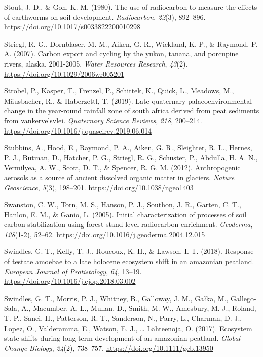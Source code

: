 \documentclass[]{article}
\begin{document}
\leavevmode\hypertarget{ref-Stout_1980}{}%
Stout, J. D., \& Goh, K. M. (1980). The use of radiocarbon to measure
the effects of earthworms on soil development. \emph{Radiocarbon},
\emph{22}(3), 892--896. \url{https://doi.org/10.1017/s0033822200010298}

\leavevmode\hypertarget{ref-Striegl_2007}{}%
Striegl, R. G., Dornblaser, M. M., Aiken, G. R., Wickland, K. P., \&
Raymond, P. A. (2007). Carbon export and cycling by the yukon, tanana,
and porcupine rivers, alaska, 2001-2005. \emph{Water Resources
Research}, \emph{43}(2). \url{https://doi.org/10.1029/2006wr005201}

\leavevmode\hypertarget{ref-Strobel_2019}{}%
Strobel, P., Kasper, T., Frenzel, P., Schittek, K., Quick, L., Meadows,
M., Mäusbacher, R., \& Haberzettl, T. (2019). Late quaternary
palaeoenvironmental change in the year-round rainfall zone of south
africa derived from peat sediments from vankervelsvlei. \emph{Quaternary
Science Reviews}, \emph{218}, 200--214.
\url{https://doi.org/10.1016/j.quascirev.2019.06.014}

\leavevmode\hypertarget{ref-Stubbins_2012}{}%
Stubbins, A., Hood, E., Raymond, P. A., Aiken, G. R., Sleighter, R. L.,
Hernes, P. J., Butman, D., Hatcher, P. G., Striegl, R. G., Schuster, P.,
Abdulla, H. A. N., Vermilyea, A. W., Scott, D. T., \& Spencer, R. G. M.
(2012). Anthropogenic aerosols as a source of ancient dissolved organic
matter in glaciers. \emph{Nature Geoscience}, \emph{5}(3), 198--201.
\url{https://doi.org/10.1038/ngeo1403}

\leavevmode\hypertarget{ref-Swanston_2005}{}%
Swanston, C. W., Torn, M. S., Hanson, P. J., Southon, J. R., Garten, C.
T., Hanlon, E. M., \& Ganio, L. (2005). Initial characterization of
processes of soil carbon stabilization using forest stand-level
radiocarbon enrichment. \emph{Geoderma}, \emph{128}(1-2), 52--62.
\url{https://doi.org/10.1016/j.geoderma.2004.12.015}

\leavevmode\hypertarget{ref-Swindles_2018}{}%
Swindles, G. T., Kelly, T. J., Roucoux, K. H., \& Lawson, I. T. (2018).
Response of testate amoebae to a late holocene ecosystem shift in an
amazonian peatland. \emph{European Journal of Protistology}, \emph{64},
13--19. \url{https://doi.org/10.1016/j.ejop.2018.03.002}

\leavevmode\hypertarget{ref-Swindles_2017}{}%
Swindles, G. T., Morris, P. J., Whitney, B., Galloway, J. M., Gałka, M.,
Gallego-Sala, A., Macumber, A. L., Mullan, D., Smith, M. W., Amesbury,
M. J., Roland, T. P., Sanei, H., Patterson, R. T., Sanderson, N., Parry,
L., Charman, D. J., Lopez, O., Valderamma, E., Watson, E. J., \ldots{}
Lähteenoja, O. (2017). Ecosystem state shifts during long-term
development of an amazonian peatland. \emph{Global Change Biology},
\emph{24}(2), 738--757. \url{https://doi.org/10.1111/gcb.13950}
\end{document}
